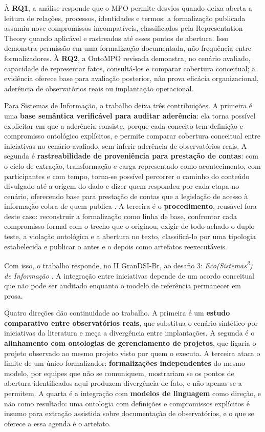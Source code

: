 À \textbf{RQ1}, a análise responde que o MPO permite desvios quando deixa aberta a leitura de relações, processos, identidades e termos: a formalização publicada assumiu nove compromissos incompatíveis, classificados pela Representation Theory quando aplicável e rastreados até esses pontos de abertura. Isso demonstra permissão em uma formalização documentada, não frequência entre formalizadores. À \textbf{RQ2}, a OntoMPO revisada demonstra, no cenário avaliado, capacidade de representar fatos, consultá-los e comparar cobertura conceitual; a evidência oferece base para avaliação posterior, não prova eficácia organizacional, aderência de observatórios reais ou implantação operacional.

Para Sistemas de Informação, o trabalho deixa três contribuições. A primeira é uma \textbf{base semântica verificável para auditar aderência}: ela torna possível explicitar em que a aderência consiste, porque cada conceito tem definição e compromisso ontológico explícitos, e permite comparar cobertura conceitual entre iniciativas no cenário avaliado, sem inferir aderência de observatórios reais. A segunda é \textbf{rastreabilidade de proveniência para prestação de contas}: com o ciclo de extração, transformação e carga representado como acontecimento, com participantes e com tempo, torna-se possível percorrer o caminho do conteúdo divulgado até a origem do dado e dizer quem respondeu por cada etapa no cenário, oferecendo base para prestação de contas que a legislação de acesso à informação cobra de quem publica \cite{L12527}. A terceira é o \textbf{procedimento}, reusável fora deste caso: reconstruir a formalização como linha de base, confrontar cada compromisso formal com o trecho que o originou, exigir de todo achado o duplo teste, a violação ontológica e a abertura no texto, classificá-lo por uma tipologia estabelecida e publicar o antes e o depois como artefatos reexecutáveis.

Com isso, o trabalho responde, no II GranDSI-Br, ao desafio 3: \textit{Eco(Sistemas\textsuperscript{2}) de Informação} \cite{araujo2025grandsi}. A integração entre iniciativas depende de um acordo conceitual que não pode ser auditado enquanto o modelo de referência permanecer em prosa.

Quatro direções dão continuidade ao trabalho. A primeira é um \textbf{estudo comparativo entre observatórios reais}, que substitua o cenário sintético por iniciativas da literatura e meça a divergência entre implantações. A segunda é o \textbf{alinhamento com ontologias de gerenciamento de projetos}, que ligaria o projeto observado ao mesmo projeto visto por quem o executa. A terceira ataca o limite de um único formalizador: \textbf{formalizações independentes} do mesmo modelo, por equipes que não se comuniquem, mostrariam se os pontos de abertura identificados aqui produzem divergência de fato, e não apenas se a permitem. A quarta é a integração com \textbf{modelos de linguagem} como direção, e não como resultado: uma ontologia com definições e compromissos explícitos é insumo para extração assistida sobre documentação de observatórios, e o que se oferece a essa agenda é o artefato.
